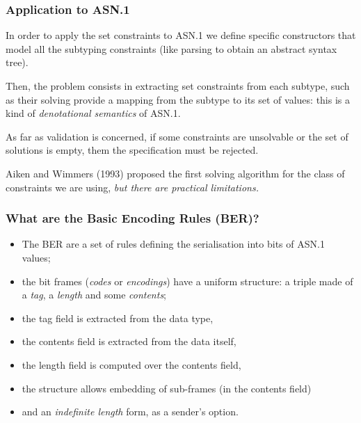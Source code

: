 \documentclass[compress,dvips,xcolor={dvipsnames},t]{beamer}
\newcommand\ASN{\textsf{ASN.1}\xspace}
\begin{document}
\begin{frame}
\frametitle{Application to \ASN}

In order to apply the set constraints to \ASN we define specific
constructors that model all the subtyping constraints (like parsing to
obtain an abstract syntax tree).

\medskip

Then, the problem consists in extracting set constraints from each
subtype, such as their solving provide a mapping from the subtype to
its set of values: this is a kind of \emph{denotational semantics} of
\ASN.

\medskip

As far as validation is concerned, if some constraints are unsolvable
or the set of solutions is empty, them the specification must be
rejected.

\medskip

Aiken and Wimmers (1993) proposed the first solving algorithm for the
class of constraints we are using, \emph{but there are practical
  limitations.}

\end{frame}

\begin{frame}
\frametitle{What are the Basic Encoding Rules (BER)?}

\begin{itemize}

  \item The BER are a set of rules defining the serialisation into
    bits of \ASN values;

  \item the bit frames (\emph{codes} or \emph{encodings}) have a
    uniform structure: a triple made of a \emph{tag}, a \emph{length}
    and some \emph{contents};

  \item the tag field is extracted from the data type,

  \item the contents field is extracted from the data itself,

  \item the length field is computed over the contents field,

  \item the structure allows embedding of sub-frames (in the contents
    field)

  \item and an \emph{indefinite length} form, as a sender's option.

\end{itemize}
\end{frame}
\end{document}
